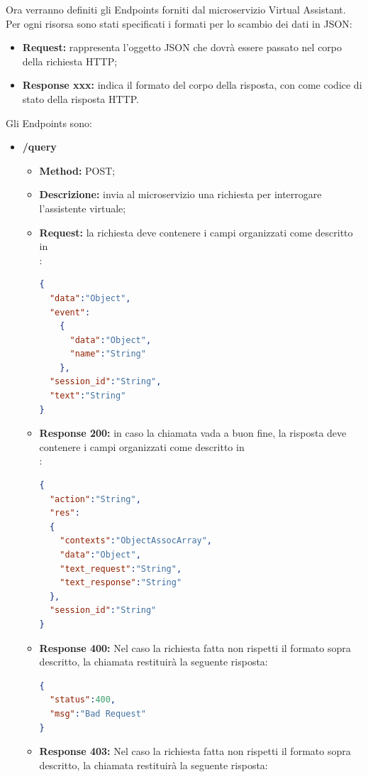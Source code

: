 Ora verranno definiti gli Endpoints forniti dal microservizio Virtual Assistant.\\
Per ogni risorsa sono stati specificati i formati per lo scambio dei dati in JSON:
\begin{itemize}
\item \textbf{Request:} rappresenta l’oggetto JSON che dovrà essere passato nel corpo della richiesta HTTP;
\item \textbf{Response xxx:} indica il formato del corpo della risposta, con  come codice di stato della risposta HTTP.
\end{itemize}
Gli Endpoints sono:
\begin{itemize}
\item \textbf{/query}\\
\begin{itemize}
\item \textbf{Method:} POST;
\item \textbf{Descrizione:} invia al microservizio una richiesta per interrogare l'assistente virtuale;
\item \textbf{Request:} la richiesta deve contenere i campi organizzati come descritto in \\:
\begin{lstlisting}[language=json,firstnumber=1]
{
  "data":"Object",
  "event":
    {
      "data":"Object",
      "name":"String"
    },
  "session_id":"String",
  "text":"String"
}
\end{lstlisting}
\newpage
\item \textbf{Response 200:} in caso la chiamata vada a buon fine, la risposta deve contenere i campi organizzati come descritto in \\:
\begin{lstlisting}[language=json,firstnumber=1]
{
  "action":"String",
  "res":
  {
    "contexts":"ObjectAssocArray",
    "data":"Object",
    "text_request":"String",
    "text_response":"String"
  },
  "session_id":"String"
}
\end{lstlisting}
\item \textbf{Response 400:} Nel caso la richiesta fatta non rispetti il formato sopra descritto, la chiamata restituirà la seguente risposta:
\begin{lstlisting}[language=json,firstnumber=1]
{
  "status":400,
  "msg":"Bad Request"
}
\end{lstlisting}
\item \textbf{Response 403:} Nel caso la richiesta fatta non rispetti il formato sopra descritto, la chiamata restituirà la seguente risposta:

\end{itemize}
\end{itemize}
